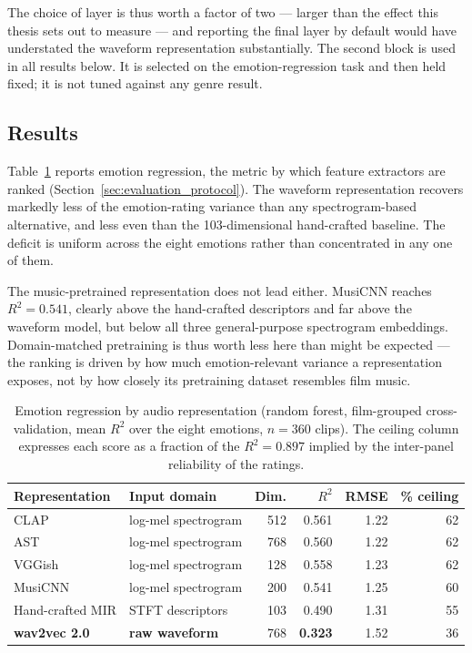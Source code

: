 The choice of layer is thus worth a factor of two --- larger than the effect this thesis
sets out to measure --- and reporting the final layer by default would have understated
the waveform representation substantially. The second block is used in all results below.
It is
selected on the emotion-regression task and then held fixed; it is not tuned against any
genre result.

\subsection{Results}

Table~\ref{tab:waveform_stage1} reports emotion regression, the metric by which feature
extractors are ranked (Section~\ref{sec:evaluation_protocol}). The waveform representation
recovers markedly less of the emotion-rating variance than any spectrogram-based
alternative, and less even than the 103-dimensional hand-crafted baseline. The deficit is
uniform across the eight emotions rather than concentrated in any one of them.

The music-pretrained representation does not lead either. MusiCNN reaches $R^2 = 0.541$,
clearly above the hand-crafted descriptors and far above the waveform model, but below
all three general-purpose spectrogram embeddings. Domain-matched pretraining is thus
worth less here than might be expected --- the ranking is driven by how much
emotion-relevant variance a representation exposes, not by how closely its pretraining
dataset resembles film music.

\begin{table}[t]
  \centering
  \caption{Emotion regression by audio representation (random forest, film-grouped
    cross-validation, mean $R^2$ over the eight emotions, $n=360$ clips). The ceiling
    column expresses each score as a fraction of the $R^2 = 0.897$ implied by the
    inter-panel reliability of the ratings.}
  \label{tab:waveform_stage1}
  \begin{tabular}{llrrrr}
    \hline
    Representation & Input domain & Dim. & $R^2$ & RMSE & \% ceiling \\
    \hline
    CLAP           & log-mel spectrogram & 512 & 0.561 & 1.22 & 62 \\
    AST            & log-mel spectrogram & 768 & 0.560 & 1.22 & 62 \\
    VGGish         & log-mel spectrogram & 128 & 0.558 & 1.23 & 62 \\
    MusiCNN        & log-mel spectrogram & 200 & 0.541 & 1.25 & 60 \\
    Hand-crafted MIR & STFT descriptors  & 103 & 0.490 & 1.31 & 55 \\
    \textbf{wav2vec 2.0} & \textbf{raw waveform} & 768 & \textbf{0.323} & 1.52 & 36 \\
    \hline
  \end{tabular}
\end{table}

